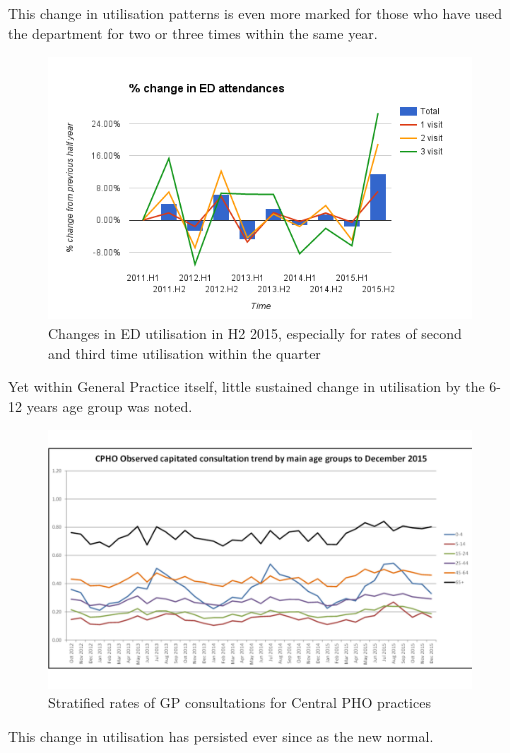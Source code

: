 \documentclass[11pt,a4paper]{article}
\begin{document}
This change in utilisation patterns is even more marked for those who have used the department for two or three times within the same year.

\begin{figure}[htp]
\centering
\includegraphics[scale=0.70]{Fchange.png}
\caption{Changes in ED utilisation in H2 2015, especially for rates of second and third time utilisation within the quarter}
\label{Changes in Ed utilisation}
\end{figure}

Yet within General Practice itself, little sustained change in utilisation by the 6-12 years age group was noted.

\begin{figure}[htp]
\centering
\includegraphics[scale=0.40]{U13one.png}
\caption{Stratified rates of GP consultations for Central PHO practices}
\label{Age stratified General Practice consultations}
\end{figure}

This change in utilisation has persisted ever since as the new normal.
\end{document}

